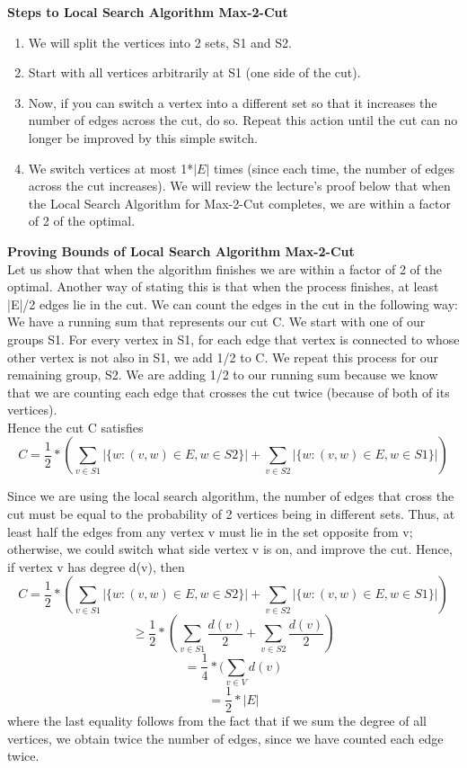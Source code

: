 \documentclass[11pt, solution, letterpaper]{format}
\begin{document}
\textbf{Steps to Local Search Algorithm Max-2-Cut} 
\begin{enumerate}
\item  We will split the vertices into 2 sets, S1 and S2.
\item  Start with all vertices arbitrarily at S1 (one side of the cut).
\item   Now, if you can
switch a vertex into a different set so that it increases the number of edges across the cut, do so. Repeat this action
until the cut can no longer be improved by this simple switch.
\item  We switch vertices at most 1*$|E|$ times (since each time, the number of edges across the cut increases). We will review the lecture's proof below that when the Local Search Algorithm for Max-2-Cut completes, we are within a factor of 2 of the optimal.
\end{enumerate}
\textbf{Proving Bounds of Local Search Algorithm Max-2-Cut} \\

Let us show that when the algorithm finishes we are within a factor of 2 of the optimal. Another way of stating this is that when the process finishes, at least |E|/2 edges lie in the cut. We can count the edges in the cut in the following way: \\
We have a running sum that represents our cut C. We start with one of our groups S1. For every vertex in S1, for each edge that vertex is connected to whose other vertex is not also in S1, we add 1/2 to C. We repeat this process for our remaining group, S2. We are adding 1/2 to our running sum because we know that we are counting each edge that crosses the cut twice (because of both of its vertices). \\  

Hence the cut C satisfies
$$C =\frac{1}{2} * (\sum_{v\in S1} |\{w: (v, w) \in E, w \in S2 \}| + \sum_{v\in S2} |\{w: (v, w) \in E, w \in S1 \}| )$$

Since we are using the local search algorithm, the number of edges that cross the cut must be equal to the probability of 2 vertices being in different sets. Thus, at least half the edges from any vertex v must lie in the set opposite
from v; otherwise, we could switch what side vertex v is on, and improve the cut. Hence, if vertex v has degree d(v),
then
$$C =\frac{1}{2} * (\sum_{v\in S1} |\{w: (v, w) \in E, w \in S2 \}| + \sum_{v\in S2} |\{w: (v, w) \in E, w \in S1 \}| )$$
$$\geq \frac{1}{2} * (\sum_{v\in S1} \frac{d(v)}{2} + \sum_{v\in S2} \frac{d(v)}{2})$$
$$=\frac{1}{4} * (\sum_{v\in V} d(v) $$ 
$$ = \frac{1}{2}*|E|$$
where the last equality follows from the fact that if we sum the degree of all vertices, we obtain twice the number of
edges, since we have counted each edge twice.
\end{document}
